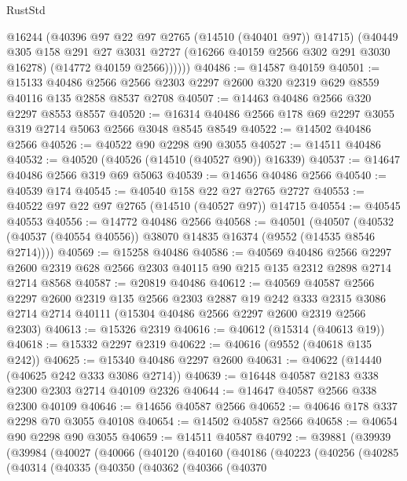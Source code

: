 \begin{lexlean}{RustStd}
\begin{coremodule}
            @16244
            (@40396 @97 @22 @97 @2765 (@14510 (@40401 @97)) @14715)
            (@40449
              @305
              @158
              @291
              @27
              @3031
              @2727
              (@16266 @40159 @2566 @302 @291 @3030 @16278)
              (@14772 @40159 @2566))))))
@40486 := @14587 @40159
@40501 := @15133
    @40486
    @2566
    @2566
    @2303
    @2297
    @2600
    @320
    @2319
    @629
    @8559
    @40116
    @135
    @2858
    @8537
    @2708
@40507 := @14463 @40486 @2566 @320 @2297 @8553 @8557
@40520 := @16314 @40486 @2566 @178 @69 @2297 @3055 @319 @2714 @5063 @2566 @3048 @8545 @8549
@40522 := @14502 @40486 @2566
@40526 := @40522 @90 @2298 @90 @3055
@40527 := @14511 @40486
@40532 := @40520 (@40526 (@14510 (@40527 @90)) @16339)
@40537 := @14647 @40486 @2566 @319 @69 @5063
@40539 := @14656 @40486 @2566
@40540 := @40539 @174
@40545 := @40540 @158 @22 @27 @2765 @2727
@40553 := @40522 @97 @22 @97 @2765 (@14510 (@40527 @97)) @14715
@40554 := @40545 @40553
@40556 := @14772 @40486 @2566
@40568 := @40501
    (@40507 (@40532 (@40537 (@40554 @40556)) @38070 @14835 @16374 (@9552 (@14535 @8546 @2714))))
@40569 := @15258 @40486
@40586 := @40569
    @40486
    @2566
    @2297
    @2600
    @2319
    @628
    @2566
    @2303
    @40115
    @90
    @215
    @135
    @2312
    @2898
    @2714
    @2714
    @8568
@40587 := @20819 @40486
@40612 := @40569
    @40587
    @2566
    @2297
    @2600
    @2319
    @135
    @2566
    @2303
    @2887
    @19
    @242
    @333
    @2315
    @3086
    @2714
    @2714
    @40111
    (@15304 @40486 @2566 @2297 @2600 @2319 @2566 @2303)
@40613 := @15326 @2319
@40616 := @40612 (@15314 (@40613 @19))
@40618 := @15332 @2297 @2319
@40622 := @40616 (@9552 (@40618 @135 @242))
@40625 := @15340 @40486 @2297 @2600
@40631 := @40622 (@14440 (@40625 @242 @333 @3086 @2714))
@40639 := @16448 @40587 @2183 @338 @2300 @2303 @2714 @40109 @2326
@40644 := @14647 @40587 @2566 @338 @2300 @40109
@40646 := @14656 @40587 @2566
@40652 := @40646 @178 @337 @2298 @70 @3055 @40108
@40654 := @14502 @40587 @2566
@40658 := @40654 @90 @2298 @90 @3055
@40659 := @14511 @40587
@40792 := @39881
    (@39939
      (@39984
        (@40027
          (@40066
            (@40120
              (@40160
                (@40186
                  (@40223
                    (@40256
                      (@40285
                        (@40314
                          (@40335
                            (@40350
                              (@40362
                                (@40366
                                  (@40370

\end{coremodule}
\end{lexlean}
